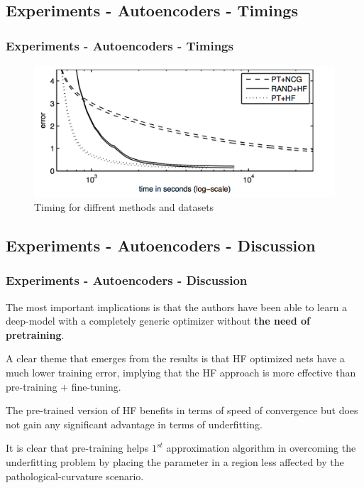 \documentclass[professionalfont]{beamer}
\begin{document}
  \subsection{Experiments - Autoencoders - Timings}
  \begin{frame}
    \frametitle{Experiments - Autoencoders - Timings}
    \begin{figure}
      \includegraphics[scale=0.4]{res2.png}
      \caption{Timing for diffrent methods and datasets}
      \label{}
    \end{figure}

  \end{frame}

  \subsection{Experiments - Autoencoders - Discussion}
  \begin{frame}
    \frametitle{Experiments - Autoencoders - Discussion}
    The most important implications is that the authors have been able to learn a deep-model
    with a completely generic optimizer without \textbf{the need of pretraining}.\newline

    A clear theme that emerges from the results is that HF optimized nets have a much lower training error,
    implying that the HF approach is more effective than pre-training $+$ fine-tuning.\newline

    The pre-trained version of HF benefits in terms of speed of convergence but does not gain any significant
    advantage in terms of underfitting.\newline

    It is clear that pre-training helps $1^{st}$ approximation algorithm in overcoming the underfitting problem by
    placing the parameter in a region less affected by the pathological-curvature scenario.
  \end{frame}
\end{document}
